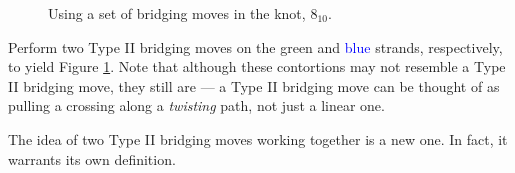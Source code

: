 \documentclass[titlepage]{article}
\begin{document}
\begin{figure}[h!]
    \vspace{-0.8em}
    \caption{Using a set of bridging moves in the knot, $8_{10}$.}
    \label{fig:810clr-2}
\end{figure}

Perform two Type II bridging moves on the \textcolor{grx}{green} and \textcolor{blue}{blue} strands, respectively, to yield Figure \ref{fig:810clr-2}. Note that although these contortions may not resemble a Type II bridging move, they still are --- a Type II bridging move can be thought of as pulling a crossing along a \emph{twisting} path, not just a linear one.\par
The idea of two Type II bridging moves working together is a new one. In fact, it warrants its own definition.\par
\end{document}

